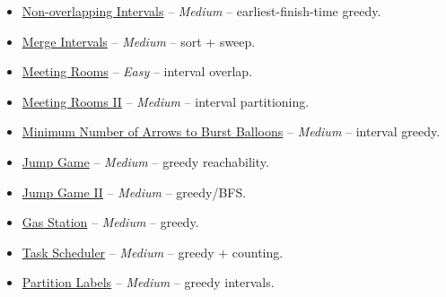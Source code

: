 \documentclass[11pt]{article}
\begin{document}
\begin{itemize}
  \item \href{https://leetcode.com/problems/non-overlapping-intervals/}{Non-overlapping Intervals} -- \emph{Medium} -- earliest-finish-time greedy.
  \item \href{https://leetcode.com/problems/merge-intervals/}{Merge Intervals} -- \emph{Medium} -- sort + sweep.
  \item \href{https://leetcode.com/problems/meeting-rooms/}{Meeting Rooms} -- \emph{Easy} -- interval overlap.
  \item \href{https://leetcode.com/problems/meeting-rooms-ii/}{Meeting Rooms II} -- \emph{Medium} -- interval partitioning.
  \item \href{https://leetcode.com/problems/minimum-number-of-arrows-to-burst-balloons/}{Minimum Number of Arrows to Burst Balloons} -- \emph{Medium} -- interval greedy.
  \item \href{https://leetcode.com/problems/jump-game/}{Jump Game} -- \emph{Medium} -- greedy reachability.
  \item \href{https://leetcode.com/problems/jump-game-ii/}{Jump Game II} -- \emph{Medium} -- greedy/BFS.
  \item \href{https://leetcode.com/problems/gas-station/}{Gas Station} -- \emph{Medium} -- greedy.
  \item \href{https://leetcode.com/problems/task-scheduler/}{Task Scheduler} -- \emph{Medium} -- greedy + counting.
  \item \href{https://leetcode.com/problems/partition-labels/}{Partition Labels} -- \emph{Medium} -- greedy intervals.
\end{itemize}
\end{document}
